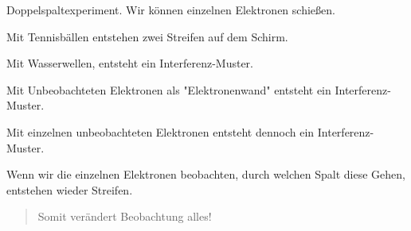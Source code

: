 \documentclass[a4paper]{article}
\begin{document}
Doppelspaltexperiment. Wir können einzelnen Elektronen schießen.

Mit Tennisbällen entstehen zwei Streifen auf dem Schirm.

Mit Wasserwellen, entsteht ein Interferenz-Muster.

Mit Unbeobachteten Elektronen als "Elektronenwand" entsteht ein Interferenz-Muster.

Mit einzelnen unbeobachteten Elektronen entsteht dennoch ein Interferenz-Muster.

Wenn wir die einzelnen Elektronen beobachten, durch welchen Spalt diese Gehen, entstehen wieder Streifen.

\begin{quote}
    Somit verändert Beobachtung alles!
\end{quote}
\end{document}
